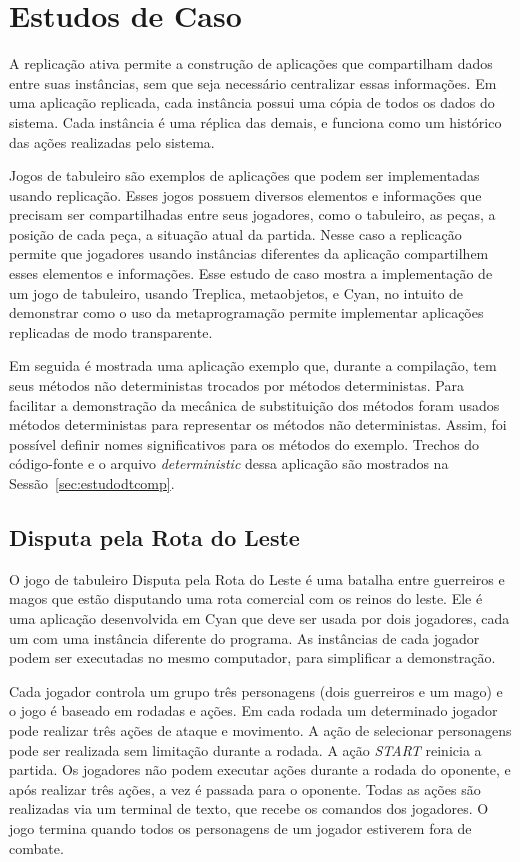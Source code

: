 \chapter{Estudos de Caso}
\label{cap:estudo}

A replicação ativa permite a construção de aplicações que compartilham dados entre suas instâncias, sem que seja necessário centralizar essas informações. Em uma aplicação replicada, cada instância possui uma cópia de todos os dados do sistema. Cada instância é uma réplica das demais, e funciona como um histórico das ações realizadas pelo sistema.

Jogos de tabuleiro são exemplos de aplicações que podem ser implementadas usando replicação. Esses jogos possuem diversos elementos e informações que precisam ser compartilhadas entre seus jogadores, como o tabuleiro, as peças, a posição de cada peça, a situação atual da partida. Nesse caso a replicação permite que jogadores usando instâncias diferentes da aplicação compartilhem esses elementos e informações. Esse estudo de caso mostra a implementação de um jogo de tabuleiro, usando Treplica, metaobjetos, e Cyan, no intuito de demonstrar como o uso da metaprogramação permite implementar aplicações replicadas de modo transparente.

Em seguida é mostrada uma aplicação exemplo que, durante a compilação, tem seus métodos não deterministas trocados por métodos deterministas. Para facilitar a demonstração da mecânica de substituição dos métodos foram usados métodos deterministas para representar os métodos não deterministas. Assim, foi possível definir nomes significativos para os métodos do exemplo. Trechos do código-fonte e o arquivo \emph{deterministic} dessa aplicação são mostrados na Sessão~\ref{sec:estudodtcomp}.

\section{Disputa pela Rota do Leste}

O jogo de tabuleiro Disputa pela Rota do Leste é uma batalha entre guerreiros e magos que estão disputando uma rota comercial com os reinos do leste. Ele é uma aplicação desenvolvida em Cyan que deve ser usada por dois jogadores, cada um com uma instância diferente do programa. As instâncias de cada jogador podem ser executadas no mesmo computador, para simplificar a demonstração.

Cada jogador controla um grupo três personagens (dois guerreiros e um mago) e o jogo é baseado em rodadas e ações. Em cada rodada um determinado jogador pode realizar três ações de ataque e movimento. A ação de selecionar personagens pode ser realizada sem limitação durante a rodada. A ação \emph{START} reinicia a partida. Os jogadores não podem executar ações durante a rodada do oponente, e após realizar três ações, a vez é passada para o oponente. Todas as ações são realizadas via um terminal de texto, que recebe os comandos dos jogadores. O jogo termina quando todos os personagens de um jogador estiverem fora de combate.

